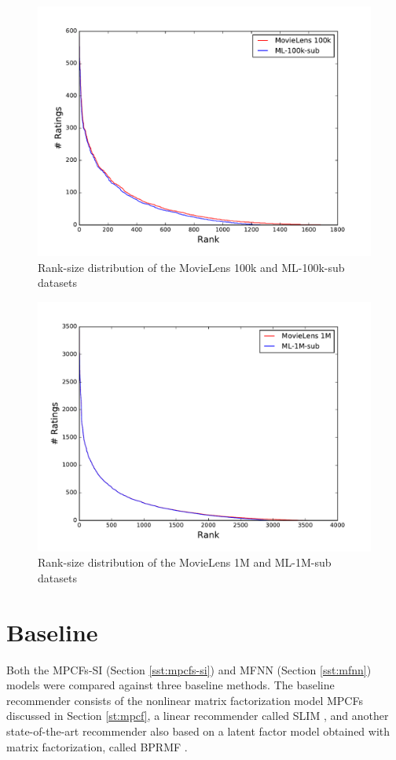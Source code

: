 \begin{figure}[p]
	\centering
	\includegraphics[width=0.7\linewidth]{./section-chapter2/figures/ml-100k_tail.pdf}
	\caption{Rank-size distribution of the MovieLens 100k and ML-100k-sub datasets}
	\label{f:ml-100k-tail}
\end{figure}

\begin{figure}[p]
	\centering
	\includegraphics[width=0.7\linewidth]{./section-chapter2/figures/ml-1m_tail.pdf}
	\caption{Rank-size distribution of the MovieLens 1M and ML-1M-sub datasets}
	\label{f:ml-1m-tail}
\end{figure}

\section{Baseline}
\label{st:baseline}

Both the MPCFs-SI (Section \ref{sst:mpcfs-si}) and MFNN (Section \ref{sst:mfnn}) models were compared against three baseline methods.
The baseline recommender consists of the nonlinear matrix factorization model MPCFs discussed in Section \ref{st:mpcf}, a linear recommender called SLIM \cite{Ning2011}, and another state-of-the-art recommender also based on a latent factor model obtained with matrix factorization, called BPRMF \cite{Rendle2009}.

